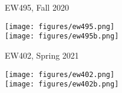 \documentclass{IEEEtran}
\begin{document}
\begin{table*}[p]
\caption{EW495, Fall 2020}
\label{tab:ew495}
\begin{center}
\texttt{[image: figures/ew495.png]}\\
\texttt{[image: figures/ew495b.png]}
\end{center}
\end{table*}

\begin{table*}[p]
\caption{EW402, Spring 2021}
\label{tab:ew402}
\begin{center}
\texttt{[image: figures/ew402.png]}\\
\texttt{[image: figures/ew402b.png]}
\end{center}
\end{table*}
\end{document}
